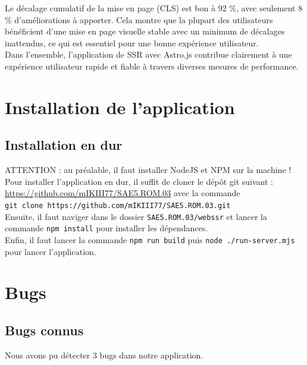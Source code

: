 \documentclass[12pt, a4paper, oneside]{thesis}
\begin{document}
Le décalage cumulatif de la mise en page (CLS) est bon à 92 \%, avec seulement 8 \% d'améliorations à apporter. Cela montre que la plupart des utilisateurs bénéficient d'une mise en page visuelle stable avec un minimum de décalages inattendus, ce qui est essentiel pour une bonne expérience utilisateur.\\

Dans l'ensemble, l'application de SSR avec Astro.js contribue clairement à une expérience utilisateur rapide et fiable à travers diverses mesures de performance.


\newpage
\section{Installation de l'application}

\subsection{Installation en dur}

ATTENTION : au préalable, il faut installer NodeJS et NPM sur la machine !\\

Pour installer l'application en dur, il suffit de cloner le dépôt git suivant : \url{https://github.com/mIKIII77/SAE5.ROM.03} avec la commande\\ 
\verb|git clone https://github.com/mIKIII77/SAE5.ROM.03.git|\\

Ensuite, il faut naviger dans le dossier \verb|SAE5.ROM.03/webssr| et lancer la commande \verb|npm install| pour installer les dépendances.\\
Enfin, il faut lancer la commande \verb|npm run build| puis \verb|node ./run-server.mjs| pour lancer l'application.\\

\newpage

\section{Bugs}

\subsection{Bugs connus}

Nous avons pu détecter 3 bugs dans notre application.\\
\end{document}
